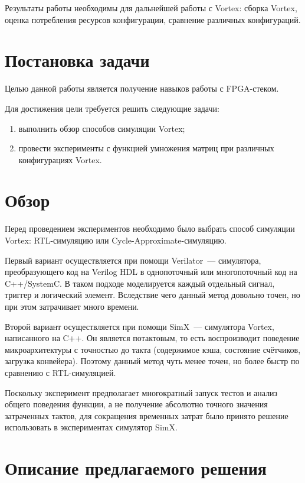 \documentclass[a4paper]{article}
\begin{document}
Результаты работы необходимы для дальнейшей работы с Vortex: сборка Vortex, оценка потребления ресурсов конфигурации, сравнение различных конфигураций.

\section{Постановка задачи}

Целью данной работы является получение навыков работы с FPGA-стеком.

Для достижения цели требуется решить следующие задачи:
\begin{enumerate}
    \item выполнить обзор способов симуляции Vortex;
    \item провести эксперименты с функцией умножения матриц при различных конфигурациях Vortex.
\end{enumerate}

\section{Обзор}

Перед проведением экспериментов необходимо было выбрать способ симуляции Vortex: RTL-симуляцию или Cycle-Approximate-симуляцию.

Первый вариант осуществляется при помощи Verilator~--- симулятора, преобразующего код на Verilog HDL в однопоточный или многопоточный код на C++/SystemC. В таком подходе моделируется каждый отдельный сигнал, триггер и логический элемент. Вследствие чего данный метод довольно точен, но при этом затрачивает много времени.

Второй вариант осуществляется при помощи SimX~--- симулятора Vortex, написанного на C++. Он является потактовым, то есть воспроизводит поведение микроархитектуры с точностью до такта (содержимое кэша, состояние счётчиков, загрузка конвейера). Поэтому данный метод чуть менее точен, но более быстр по сравнению с RTL-симуляцией.

Поскольку эксперимент предполагает многократный запуск тестов и анализ общего поведения функции, а не получение абсолютно точного значения затраченных тактов, для сокращения временных затрат было принято решение использовать в экспериментах симулятор SimX.

\section{Описание предлагаемого решения}
\end{document}
